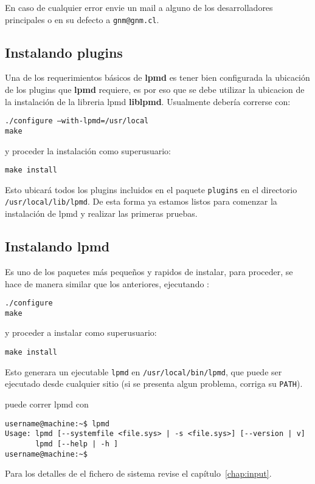 \documentclass[a4paper,10pt]{scrbook}
\newcommand{\lpmd}{\textbf{lpmd }}
\newcommand{\control}[1]{\begin{center}\begin{minipage}{10cm}\texttt{#1}\end{minipage}\end{center}}
\begin{document}
En caso de cualquier error envie un mail a alguno de los desarrolladores principales o en su defecto a \verb|gnm@gnm.cl|.

\subsection{Instalando plugins}

Una de los requerimientos b\'asicos de \lpmd es tener bien configurada la ubicaci\'on de los plugins que \lpmd requiere, es por eso que se debe utilizar la ubicacion de la instalaci\'on de la libreria lpmd \textbf{liblpmd}. Usualmente deber\'ia correrse con:

\control{./configure --with-lpmd=/usr/local \\ make}

y proceder la instalaci\'on como superusuario:

\control{make install}

Esto ubicar\'a todos los plugins incluidos en el paquete \verb|plugins| en el directorio \verb|/usr/local/lib/lpmd|. De esta forma ya estamos listos para comenzar la instalaci\'on de lpmd y realizar las primeras pruebas.

\subsection{Instalando lpmd}

Es uno de los paquetes m\'as peque\~nos y rapidos de instalar, para proceder, se hace de manera similar que los anteriores, ejecutando :

\control{./configure \\ make}

y proceder a instalar como superusuario:

\control{make install}

Esto generara un ejecutable \verb|lpmd| en \verb|/usr/local/bin/lpmd|, que puede ser ejecutado desde cualquier sitio (si se presenta algun problema, corriga su \verb|PATH|).

puede correr lpmd con

\begin{verbatim}
username@machine:~$ lpmd
Usage: lpmd [--systemfile <file.sys> | -s <file.sys>] [--version | v]
       lpmd [--help | -h ]
username@machine:~$
\end{verbatim}

Para los detalles de el fichero de sistema revise el cap\'itulo~\ref{chap:input}.
\end{document}
